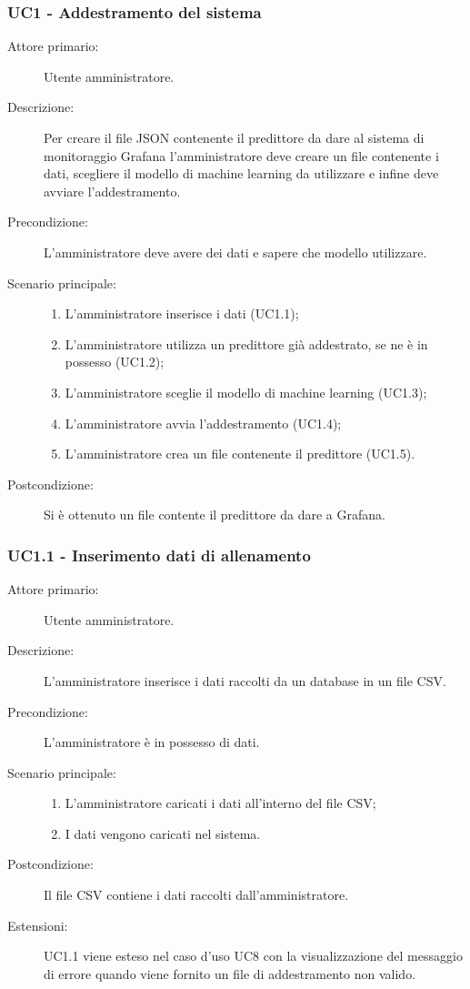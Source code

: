 \subsubsection{UC1 - Addestramento del sistema}
\label{sssec:uc1}
\begin{description}
  \item[Attore primario:] Utente amministratore.
  \item[Descrizione:] Per creare il file JSON contenente il predittore da dare al sistema di monitoraggio Grafana l'amministratore deve creare un file contenente i dati, scegliere il modello di machine learning da utilizzare e infine deve avviare l'addestramento.
  \item[Precondizione:] L'amministratore deve avere dei dati e sapere che modello utilizzare.
  \item[Scenario principale:]
  \begin{enumerate}
    \item L'amministratore inserisce i dati (UC1.1);
    \item L'amministratore utilizza un predittore già addestrato, se ne è in possesso (UC1.2);
    \item L'amministratore sceglie il modello di machine learning (UC1.3);
    \item L'amministratore avvia l'addestramento (UC1.4);
    \item L'amministratore crea un file contenente il predittore (UC1.5).
  \end{enumerate}
  \item[Postcondizione:] Si è ottenuto un file contente il predittore da dare a Grafana.
\end{description}

\subsubsection{UC1.1 - Inserimento dati di allenamento}
\label{sssec:uc1.1}
\begin{description}
  \item[Attore primario:] Utente amministratore.
  \item[Descrizione:] L'amministratore inserisce i dati raccolti da un database in un file CSV.
  \item[Precondizione:] L'amministratore è in possesso di dati.
  \item[Scenario principale:]
  \begin{enumerate}
    \item L'amministratore caricati i dati all'interno del file CSV;
    \item I dati vengono caricati nel sistema.
  \end{enumerate}
  \item[Postcondizione:] Il file CSV contiene i dati raccolti dall'amministratore.
  \item[Estensioni:] UC1.1 viene esteso nel caso d'uso UC8 con la visualizzazione del messaggio di errore quando viene fornito un file di addestramento non valido.
\end{description}

